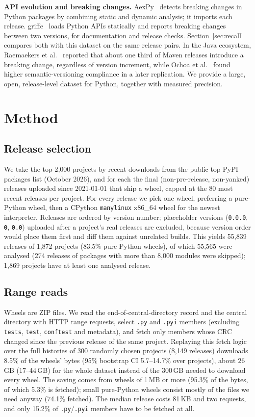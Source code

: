 \documentclass[10pt,twocolumn,letterpaper]{article}
\begin{document}
\textbf{API evolution and breaking changes.} AexPy~\cite{aexpy} detects breaking changes in Python packages by
combining static and dynamic analysis; it imports each release. griffe~\cite{griffe} loads Python APIs statically
and reports breaking changes between two versions, for documentation and release checks. Section~\ref{sec:recall}
compares both with this dataset on the same release pairs. In the Java ecosystem, Raemaekers et al.~\cite{raemaekers2014}
reported that about one third of Maven releases introduce a breaking change, regardless of version increment, while
Ochoa et al.~\cite{ochoa2022} found higher semantic-versioning compliance in a later replication. We provide a large,
open, release-level dataset for Python, together with measured precision.

\section{Method}\label{sec:method}
\subsection{Release selection}
We take the top 2,000 projects by recent downloads from the public top-PyPI-packages list (October 2026),
and for each the final (non-pre-release, non-yanked) releases uploaded since 2021-01-01 that ship a wheel,
capped at the 80 most recent releases per project. For every release we pick one wheel, preferring a pure-Python
wheel, then a CPython \texttt{manylinux} x86\_64 wheel for the newest interpreter. Releases are ordered by version
number; placeholder versions (\texttt{0.0.0}, \texttt{0}, \texttt{0.0}) uploaded after a project's real releases are
excluded, because version order would place them first and diff them against unrelated builds. This yields
55,839 releases of 1,872 projects (83.5\% pure-Python wheels), of which 55,565 were analysed
(274 releases of packages with more than 8,000 modules were skipped); 1,869 projects have
at least one analysed release.

\subsection{Range reads}
Wheels are ZIP files. We read the end-of-central-directory record and the central directory with HTTP range
requests, select \texttt{.py} and \texttt{.pyi} members (excluding \texttt{tests}, \texttt{test},
\texttt{conftest} and metadata), and fetch only members whose CRC changed since the previous release of the same
project. Replaying this fetch logic over the full histories of 300 randomly chosen projects
(8,149 releases) downloads 8.5\% of the wheels' bytes (95\% bootstrap CI 5.7--14.7\% over
projects), about 26\,GB (17--44\,GB) for the whole dataset instead of the 300\,GB needed to
download every wheel. The saving comes from wheels of 1\,MB or more (95.3\% of the bytes, of which
5.3\% is fetched); small pure-Python wheels consist mostly of the files we need anyway (74.1\%
fetched). The median release costs 81\,KB and two requests, and only 15.2\% of
\texttt{.py}/\texttt{.pyi} members have to be fetched at all.
\end{document}
